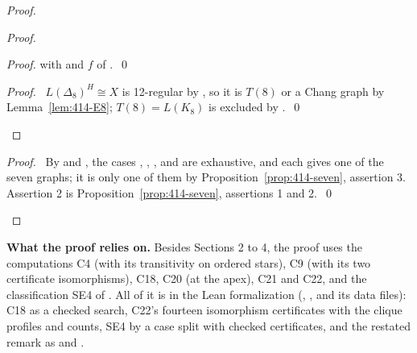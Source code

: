 \begin{proof}
\begin{proof}
\begin{proof}
   with  and $f$ of .~\qed\end{proof}
  \qedstep
  \begin{proof}\pf\ $L(\Delta_8)^H\cong X$ is 12-regular by , so it is $T(8)$ or
   a Chang graph by Lemma~\ref{lem:414-E8}; $T(8)=L(K_8)$ is excluded by
   .~\qed\end{proof}
 \end{proof}
 \qedstep
 \begin{proof}\pf\ By  and , the cases ,
  , ,  and  are
  exhaustive, and each gives one of the seven graphs; it is only one of them by
  Proposition~\ref{prop:414-seven}, assertion 3. Assertion 2 is
  Proposition~\ref{prop:414-seven}, assertions 1 and 2.~\qed\end{proof}
\end{proof}

\medskip\noindent\textbf{What the proof relies on.}
Besides Sections 2 to 4, the proof uses the computations C4 (with its transitivity on ordered
stars),
C9 (with its two certificate isomorphisms), C18, C20 (at the apex), C21 and C22, and the classification SE4 of
. All of it is in the Lean formalization
(, ,  and its data files): C18 as a
checked search, C22's fourteen isomorphism certificates with the clique profiles and counts, SE4
by a case split with checked certificates, and the restated remark as
 and .

\endgroup

